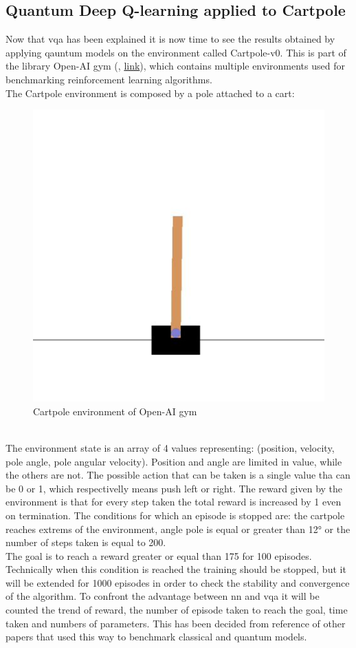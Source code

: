 \subsection{Quantum Deep Q-learning applied to Cartpole} 
Now that \acrlong{vqa} has been explained it is now time to see the results obtained by applying qauntum models on the environment called Cartpole-v0. This is part of the library Open-AI gym (\cite{1606.01540}, \href{https://www.gymlibrary.ml/}{link}), which contains multiple environments used for benchmarking reinforcement learning algorithms.\\
The Cartpole environment is composed by a pole attached to a cart:
\begin{figure}[h]
	\centering
	\includegraphics[width=0.7\linewidth]{img/cartpole}
	\caption[Cartpole environment]{Cartpole environment of Open-AI gym}
	\label{fig:cartpole}
\end{figure}\\
The environment state is an array of 4 values representing: (position, velocity, pole angle, pole angular velocity). Position and angle are limited in value, while the others are not. The possible action that can be taken is a single value tha can be 0 or 1, which respectivelly means push left or right. The reward given by the environment is that for every step taken the total reward is increased by 1 even on termination. The conditions for which an episode is stopped are: the cartpole reaches extrems of the environment, angle pole is equal or greater than 12° or the number of steps taken is equal to 200.\\
The goal is to reach a reward greater or equal than 175 for 100 episodes. Technically when this condition is reached the training should be stopped, but it will be extended for 1000 episodes in order to check the stability and convergence of the algorithm. To confront the advantage between \acrlong{nn} and \acrlong{vqa} it will be counted the trend of reward, the number of episode taken to reach the goal, time taken and numbers of parameters.
This has been decided from reference of other papers that used this way to benchmark classical and quantum models.\\
